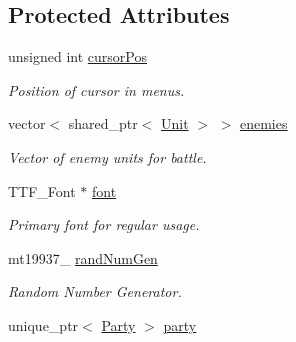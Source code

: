 \subsection*{Protected Attributes}
\begin{DoxyCompactItemize}
\item 
unsigned int \hyperlink{class_game_state_a31555272335ffcfb24af67bc826e1521}{cursor\+Pos}\hypertarget{class_game_state_a31555272335ffcfb24af67bc826e1521}{}\label{class_game_state_a31555272335ffcfb24af67bc826e1521}

\begin{DoxyCompactList}\small\item\em Position of cursor in menus. \end{DoxyCompactList}\item 
vector$<$ shared\+\_\+ptr$<$ \hyperlink{class_unit}{Unit} $>$ $>$ \hyperlink{class_game_state_a5a075a4ab1460fb1035c6b87c56e6c05}{enemies}\hypertarget{class_game_state_a5a075a4ab1460fb1035c6b87c56e6c05}{}\label{class_game_state_a5a075a4ab1460fb1035c6b87c56e6c05}

\begin{DoxyCompactList}\small\item\em Vector of enemy units for battle. \end{DoxyCompactList}\item 
T\+T\+F\+\_\+\+Font $\ast$ \hyperlink{class_game_state_a39f32585535aa7a90c2e66f1e6d474e0}{font}\hypertarget{class_game_state_a39f32585535aa7a90c2e66f1e6d474e0}{}\label{class_game_state_a39f32585535aa7a90c2e66f1e6d474e0}

\begin{DoxyCompactList}\small\item\em Primary font for regular usage. \end{DoxyCompactList}\item 
mt19937\+\_ \hyperlink{class_game_state_a64e33a5deae96a673585c1a408abce5a}{rand\+Num\+Gen}\hypertarget{class_game_state_a64e33a5deae96a673585c1a408abce5a}{}\label{class_game_state_a64e33a5deae96a673585c1a408abce5a}

\begin{DoxyCompactList}\small\item\em Random Number Generator. \end{DoxyCompactList}\item 
unique\+\_\+ptr$<$ \hyperlink{class_party}{Party} $>$ \hyperlink{class_game_state_a90d33253ae1bf970ec7f89b2f3975048}{party}\hypertarget{class_game_state_a90d33253ae1bf970ec7f89b2f3975048}{}\label{class_game_state_a90d33253ae1bf970ec7f89b2f3975048}


\end{DoxyCompactItemize}
